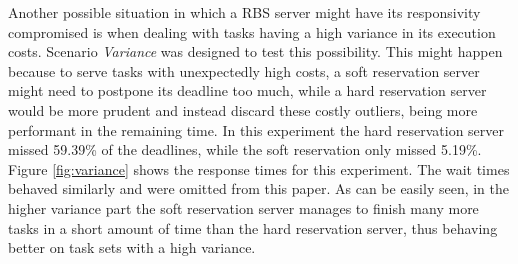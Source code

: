 \documentclass[12pt]{article}
\newcommand{\Ltres}{\textit{Variance}}
\begin{document}
Another possible situation in which a RBS server might have its
responsivity compromised is when dealing with tasks having a high
variance in its execution costs. Scenario \Ltres{} was designed to test this
possibility. This might happen because to serve tasks with
unexpectedly high costs, a soft reservation server might need to
postpone its deadline too much, while a hard reservation server would
be more prudent and instead discard these costly outliers, being more
performant in the remaining time. In this experiment the hard
reservation server missed 59.39\% of the deadlines, while the soft
reservation only missed 5.19\%. Figure \ref{fig:variance} shows the
response times for this experiment. The wait times behaved similarly
and were omitted from this paper. As can be easily seen, in the
higher variance part the soft reservation server manages to finish
many more tasks in a short amount of time than the hard reservation
server, thus behaving better on task sets with a high variance.
\end{document}
